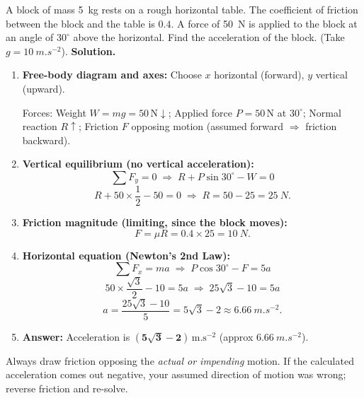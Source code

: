 \documentclass[11pt]{article}
\newcommand{\legende}[1]{\par\vspace{6pt}{\popsemi\fontsize{9}{11.5}\selectfont\color{popmuted}#1}}
\begin{document}
\begin{exoresolu}
A block of mass \SI{5}{kg} rests on a rough horizontal table. The coefficient of friction between the block and the table is $0.4$. A force of \SI{50}{N} is applied to the block at an angle of $30^\circ$ above the horizontal. Find the acceleration of the block. (Take $g = \SI{10}{m.s^{-2}}$).
\tcblower
\textbf{Solution.}
\begin{enumerate}
    \item \textbf{Free-body diagram and axes:} Choose $x$ horizontal (forward), $y$ vertical (upward).
    \begin{popfigure}
    \legende{Forces on the block}
    \end{popfigure}
    Forces: Weight $W=mg=50\,\mathrm{N}\downarrow$; Applied force $P=50\,\mathrm{N}$ at $30^\circ$; Normal reaction $R\uparrow$; Friction $F$ opposing motion (assumed forward $\Rightarrow$ friction backward).
    \item \textbf{Vertical equilibrium (no vertical acceleration):}
    \[
    \sum F_y = 0 \;\Longrightarrow\; R + P\sin 30^\circ - W = 0
    \]
    \[
    R + 50 \times \frac{1}{2} - 50 = 0 \;\Longrightarrow\; R = 50 - 25 = \SI{25}{N}.
    \]
    \item \textbf{Friction magnitude (limiting, since the block moves):}
    \[
    F = \mu R = 0.4 \times 25 = \SI{10}{N}.
    \]
    \item \textbf{Horizontal equation (Newton's 2nd Law):}
    \[
    \sum F_x = m a \;\Longrightarrow\; P\cos 30^\circ - F = 5 a
    \]
    \[
    50 \times \frac{\sqrt{3}}{2} - 10 = 5a \;\Longrightarrow\; 25\sqrt{3} - 10 = 5a
    \]
    \[
    a = \frac{25\sqrt{3} - 10}{5} = 5\sqrt{3} - 2 \approx \SI{6.66}{m.s^{-2}}.
    \]
    \item \textbf{Answer:} Acceleration is $\boldsymbol{(5\sqrt{3}-2)\,\mathrm{m.s^{-2}}}$ (approx $\SI{6.66}{m.s^{-2}}$).
\end{enumerate}
\begin{attention}
Always draw friction opposing the \emph{actual or impending} motion. If the calculated acceleration comes out negative, your assumed direction of motion was wrong; reverse friction and re-solve.
\end{attention}
\end{exoresolu}
\end{document}
